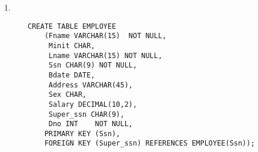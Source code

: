 \documentclass{article}
\begin{document}
\begin{description}
	\item[1.]
	\begin{lstlisting}
CREATE TABLE EMPLOYEE
	(Fname VARCHAR(15)	NOT NULL,
	 Minit CHAR,
	 Lname VARCHAR(15) NOT NULL,
	 Ssn CHAR(9) NOT NULL,
	 Bdate DATE,
	 Address VARCHAR(45),
	 Sex CHAR,
	 Salary DECIMAL(10,2),
	 Super_ssn CHAR(9),
	 Dno INT	NOT NULL,
	PRIMARY KEY (Ssn),
	FOREIGN KEY (Super_ssn) REFERENCES EMPLOYEE(Ssn));	
	\end{lstlisting}
\end{description}
\end{document}
